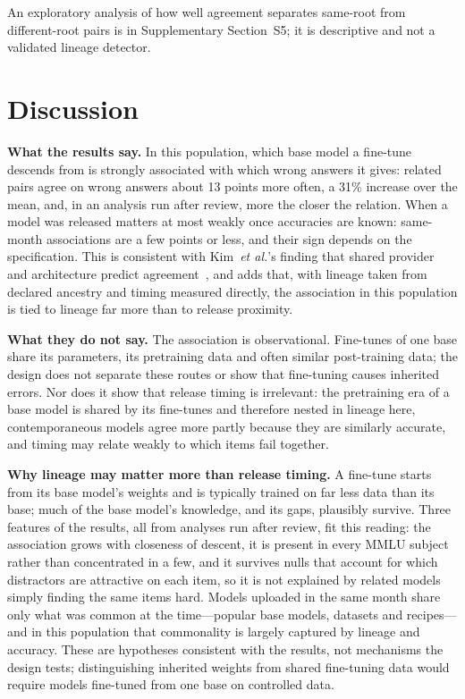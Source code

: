 \documentclass{ieeeaccess}
\theoremstyle{definition}
\theoremstyle{plain}
\begin{document}
An exploratory analysis of how well agreement separates same-root from different-root pairs is in Supplementary Section~S5; it is descriptive and not a validated lineage detector.

\section{Discussion}
\label{sec:discussion}

\textbf{What the results say.} In this population, which base model a fine-tune descends from is strongly associated with which wrong answers it gives: related pairs agree on wrong answers about 13 points more often, a 31\% increase over the mean, and, in an analysis run after review, more the closer the relation. When a model was released matters at most weakly once accuracies are known: same-month associations are a few points or less, and their sign depends on the specification. This is consistent with Kim~\textit{et al.}'s finding that shared provider and architecture predict agreement~\cite{kim2025}, and adds that, with lineage taken from declared ancestry and timing measured directly, the association in this population is tied to lineage far more than to release proximity.

\textbf{What they do not say.} The association is observational. Fine-tunes of one base share its parameters, its pretraining data and often similar post-training data; the design does not separate these routes or show that fine-tuning causes inherited errors. Nor does it show that release timing is irrelevant: the pretraining era of a base model is shared by its fine-tunes and therefore nested in lineage here, contemporaneous models agree more partly because they are similarly accurate, and timing may relate weakly to which items fail together.

\textbf{Why lineage may matter more than release timing.} A fine-tune starts from its base model's weights and is typically trained on far less data than its base; much of the base model's knowledge, and its gaps, plausibly survive. Three features of the results, all from analyses run after review, fit this reading: the association grows with closeness of descent, it is present in every MMLU subject rather than concentrated in a few, and it survives nulls that account for which distractors are attractive on each item, so it is not explained by related models simply finding the same items hard. Models uploaded in the same month share only what was common at the time---popular base models, datasets and recipes---and in this population that commonality is largely captured by lineage and accuracy. These are hypotheses consistent with the results, not mechanisms the design tests; distinguishing inherited weights from shared fine-tuning data would require models fine-tuned from one base on controlled data.
\end{document}
